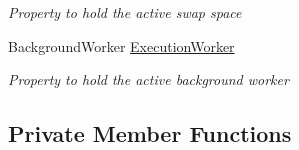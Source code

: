 \begin{DoxyCompactItemize}
\begin{DoxyCompactList}\small\item\em Property to hold the active swap space \end{DoxyCompactList}\item 
Background\+Worker \hyperlink{class_c_p_u___o_s___simulator_1_1_main_window_aab5d6c95426ebe1e75b7c3bfc0488b84}{Execution\+Worker}
\begin{DoxyCompactList}\small\item\em Property to hold the active background worker \end{DoxyCompactList}\end{DoxyCompactItemize}
\subsection*{Private Member Functions}
